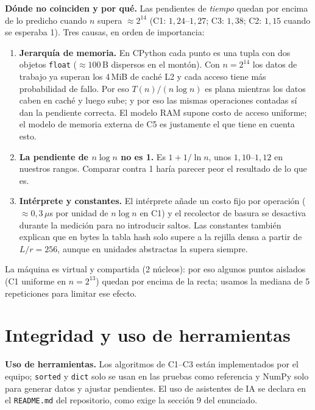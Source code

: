 \documentclass[11pt,letterpaper]{article}
\theoremstyle{plain}
\theoremstyle{definition}
\begin{document}
\textbf{Dónde no coinciden y por qué.} Las pendientes de \emph{tiempo} quedan por encima de lo predicho
cuando $n$ supera $\approx2^{14}$ (C1: $1{,}24$--$1{,}27$; C3: $1{,}38$; C2: $1{,}15$ cuando se esperaba 1).
Tres causas, en orden de importancia:
\begin{enumerate}
  \item \textbf{Jerarquía de memoria.} En CPython cada punto es una tupla con dos objetos
  \texttt{float} ($\approx100$\,B dispersos en el montón). Con $n=2^{14}$ los datos de trabajo ya
  superan los 4\,MiB de caché L2 y cada acceso tiene más probabilidad de fallo. Por eso
  $T(n)/(n\log n)$ es plana mientras los datos caben en caché y luego sube; y por eso las mismas
  operaciones contadas sí dan la pendiente correcta. El modelo RAM supone costo de acceso uniforme;
  el modelo de memoria externa de C5 es justamente el que tiene en cuenta esto.
  \item \textbf{La pendiente de $n\log n$ no es 1.} Es $1+1/\ln n$, unos $1{,}10$--$1{,}12$ en nuestros
  rangos. Comparar contra 1 haría parecer peor el resultado de lo que es.
  \item \textbf{Intérprete y constantes.} El intérprete añade un costo fijo por operación
  ($\approx0{,}3\,\mu$s por unidad de $n\log n$ en C1) y el recolector de basura se desactiva durante la
  medición para no introducir saltos. Las constantes también explican que en bytes la tabla hash solo
  supere a la rejilla densa a partir de $L/r=256$, aunque en unidades abstractas la supera siempre.
\end{enumerate}
La máquina es virtual y compartida (2 núcleos): por eso algunos puntos aislados (C1 uniforme en
$n=2^{13}$) quedan por encima de la recta; usamos la mediana de 5 repeticiones para limitar ese efecto.

\section{Integridad y uso de herramientas}

\textbf{Uso de herramientas.} Los algoritmos de C1--C3 están implementados por el
equipo; \texttt{sorted} y \texttt{dict} solo se usan en las pruebas como referencia y NumPy solo para
generar datos y ajustar pendientes. El uso de asistentes de IA se declara en el \texttt{README.md}
del repositorio, como exige la sección 9 del enunciado.

\end{document}

